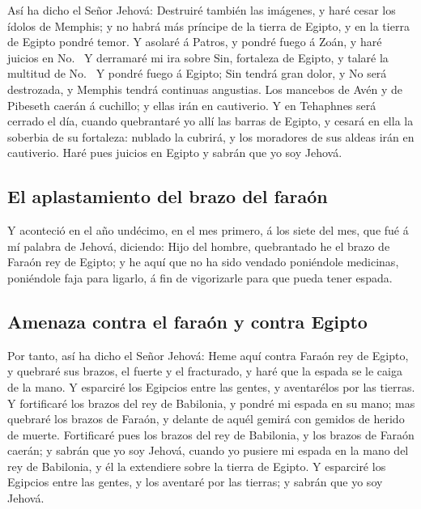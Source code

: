  Así ha dicho el Señor Jehová: Destruiré también las
imágenes, y haré cesar los ídolos de Memphis; y no habrá más príncipe de
la tierra de Egipto, y en la tierra de Egipto pondré temor.
 Y asolaré á Patros, y pondré fuego á Zoán, y haré
juicios en No.~ Y derramaré mi ira sobre Sin, fortaleza
de Egipto, y talaré la multitud de No.~ Y pondré fuego á
Egipto; Sin tendrá gran dolor, y No será destrozada, y Memphis tendrá
continuas angustias.  Los mancebos de Avén y de Pibeseth
caerán á cuchillo; y ellas irán en cautiverio.  Y en
Tehaphnes será cerrado el día, cuando quebrantaré yo allí las barras de
Egipto, y cesará en ella la soberbia de su fortaleza: nublado la
cubrirá, y los moradores de sus aldeas irán en cautiverio.
 Haré pues juicios en Egipto y sabrán que yo soy Jehová.

\hypertarget{el-aplastamiento-del-brazo-del-farauxf3n}{%
\subsection{El aplastamiento del brazo del
faraón}\label{el-aplastamiento-del-brazo-del-farauxf3n}}

 Y aconteció en el año undécimo, en el mes primero, á los
siete del mes, que fué á mí palabra de Jehová, diciendo: 
Hijo del hombre, quebrantado he el brazo de Faraón rey de Egipto; y he
aquí que no ha sido vendado poniéndole medicinas, poniéndole faja para
ligarlo, á fin de vigorizarle para que pueda tener espada.

\hypertarget{amenaza-contra-el-farauxf3n-y-contra-egipto}{%
\subsection{Amenaza contra el faraón y contra
Egipto}\label{amenaza-contra-el-farauxf3n-y-contra-egipto}}

 Por tanto, así ha dicho el Señor Jehová: Heme aquí
contra Faraón rey de Egipto, y quebraré sus brazos, el fuerte y el
fracturado, y haré que la espada se le caiga de la mano. 
Y esparciré los Egipcios entre las gentes, y aventarélos por las
tierras.  Y fortificaré los brazos del rey de Babilonia,
y pondré mi espada en su mano; mas quebraré los brazos de Faraón, y
delante de aquél gemirá con gemidos de herido de muerte. 
Fortificaré pues los brazos del rey de Babilonia, y los brazos de Faraón
caerán; y sabrán que yo soy Jehová, cuando yo pusiere mi espada en la
mano del rey de Babilonia, y él la extendiere sobre la tierra de Egipto.
 Y esparciré los Egipcios entre las gentes, y los
aventaré por las tierras; y sabrán que yo soy Jehová.

